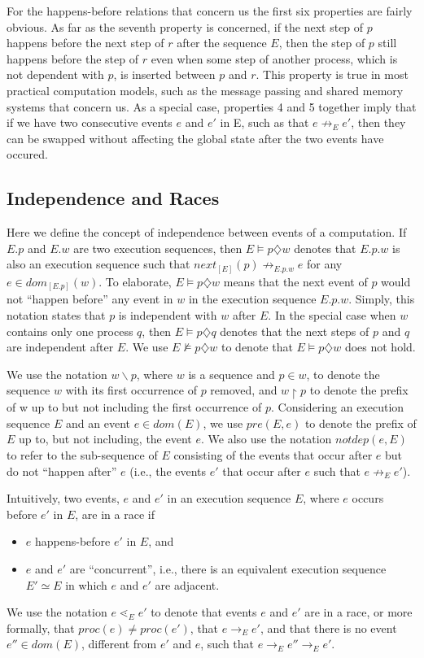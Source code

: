 For the happens-before relations that concern us the first six properties 
are fairly obvious. As far as the seventh property is concerned,
if the next step of $p$ happens before the next step
of $r$ after the sequence $E$, then the step of $p$ still happens before
the step of $r$ even when some step of another process, which is not
dependent with $p$, is inserted between $p$ and $r$. This property is true
in most practical computation models, such as the message passing and shared
memory systems that concern us.
As a special case, properties 4 and 5 together imply that if we have two consecutive events 
$e$ and $e'$ in E, such as that $e \not \rightarrow_{E} e'$, then they can
be swapped without affecting the global state after the two events have occured.

\subsection{Independence and Races}

Here we define the concept of independence between events of a computation. If
$E.p$ and $E.w$ are two execution sequences, then $E \models p\diamondsuit w$ denotes
that $E.p.w$ is also an execution sequence such that $next_{[E]}(p) \not \rightarrow_{E.p.w} e$
for any $e \in dom_{[E.p]}(w)$. To elaborate, $E \models p \diamondsuit w$ means that
the next event of $p$ would not “happen before” any event in $w$
in the execution sequence $E.p.w$. Simply, this notation states that $p$ is
independent with $w$ after $E$. In the special case when $w$ contains
only one process $q$, then $E \models p \diamondsuit q$ denotes that the next steps of
$p$ and $q$ are independent after $E$. We use $E \not \models p \diamondsuit w$ to denote that
$E\models p \diamondsuit w$ does not hold.


We use the notation $w \backslash p$, where $w$ is a sequence and $p \in w$, to denote the sequence
$w$ with its first occurrence of $p$ removed, and $w \upharpoonright p$ to denote the
prefix of w up to but not including the first occurrence of $p$. 
Considering an execution sequence $E$ and an event $e \in  dom(E)$, we use $pre(E,e)$
to denote the prefix of $E$ up to, but not including, the event $e$. We also use 
the notation $notdep(e, E)$ to refer to the 
sub-sequence of $E$ consisting of the events that occur after $e$ but do
not “happen after” $e$ (i.e., the events $e'$ that occur after $e$ such that
$e \not \rightarrow_E e'$).

Intuitively, two events, $e$ and $e'$ in an execution sequence $E$, where
$e$ occurs before $e'$ in $E$, are in a race if
\begin{itemize}
\item $e$ happens-before $e'$ in $E$, and
\item $e$ and $e'$ are “concurrent”, i.e., there is an equivalent execution
sequence $E' \simeq E$ in which $e$ and $e'$ are adjacent.
\end{itemize}
We use the notation $e \lessdot_E e'$ to denote that events $e$ and $e'$ are in a race, 
or more formally, that $proc(e) \not = proc(e')$, that $e \rightarrow_E e'$,
and that there is no event $e'' \in dom(E)$, different from $e'$ and $e$,
such that $e \rightarrow_E e'' \rightarrow_E e'$.

